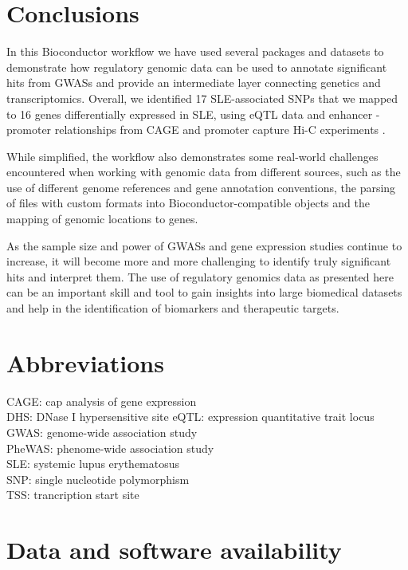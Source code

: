 \documentclass[9pt,a4paper,]{extarticle}
\begin{document}
\section{Conclusions}\label{conclusions}

In this Bioconductor workflow we have used several packages and datasets to demonstrate how regulatory genomic data can be used to annotate significant hits from GWASs and provide an intermediate layer connecting genetics and transcriptomics.
Overall, we identified 17 SLE-associated SNPs that we mapped to 16 genes differentially expressed in SLE, using eQTL data \citep{GTEx2017a} and enhancer - promoter relationships from CAGE \citep{Fantom2014} and promoter capture Hi-C experiments \citep{Javierre2016}.

While simplified, the workflow also demonstrates some real-world challenges encountered when working with genomic data from different sources, such as the use of different genome references and gene annotation conventions, the parsing of files with custom formats into Bioconductor-compatible objects and the mapping of genomic locations to genes.

As the sample size and power of GWASs and gene expression studies continue to increase, it will become more and more challenging to identify truly significant hits and interpret them.
The use of regulatory genomics data as presented here can be an important skill and tool to gain insights into large biomedical datasets and help in the identification of biomarkers and therapeutic targets.

\section{Abbreviations}\label{abbreviations}

CAGE: cap analysis of gene expression\\
DHS: DNase I hypersensitive site
eQTL: expression quantitative trait locus\\
GWAS: genome-wide association study\\
PheWAS: phenome-wide association study\\
SLE: systemic lupus erythematosus\\
SNP: single nucleotide polymorphism\\
TSS: trancription start site

\section{Data and software availability}\label{data-and-software-availability}
\end{document}
